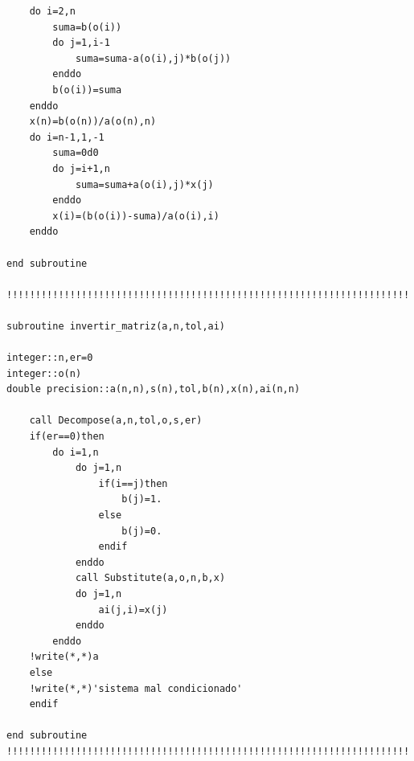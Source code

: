 \documentclass[letterpaper]{article}
\begin{document}
\begin{lstlisting}
	do i=2,n
		suma=b(o(i))
		do j=1,i-1
			suma=suma-a(o(i),j)*b(o(j))
		enddo
		b(o(i))=suma
	enddo
	x(n)=b(o(n))/a(o(n),n)
	do i=n-1,1,-1
		suma=0d0
		do j=i+1,n
			suma=suma+a(o(i),j)*x(j)
		enddo
		x(i)=(b(o(i))-suma)/a(o(i),i)
	enddo

end subroutine

!!!!!!!!!!!!!!!!!!!!!!!!!!!!!!!!!!!!!!!!!!!!!!!!!!!!!!!!!!!!!!!!!!!!!!!

subroutine invertir_matriz(a,n,tol,ai)

integer::n,er=0
integer::o(n)
double precision::a(n,n),s(n),tol,b(n),x(n),ai(n,n)

	call Decompose(a,n,tol,o,s,er)
	if(er==0)then
		do i=1,n
			do j=1,n
				if(i==j)then
					b(j)=1.
				else
					b(j)=0.
				endif
			enddo
			call Substitute(a,o,n,b,x)
			do j=1,n
				ai(j,i)=x(j)
			enddo
		enddo
	!write(*,*)a
	else
	!write(*,*)'sistema mal condicionado'
	endif

end subroutine
!!!!!!!!!!!!!!!!!!!!!!!!!!!!!!!!!!!!!!!!!!!!!!!!!!!!!!!!!!!!!!!!!!!!!!!

\end{lstlisting}
\end{document}
